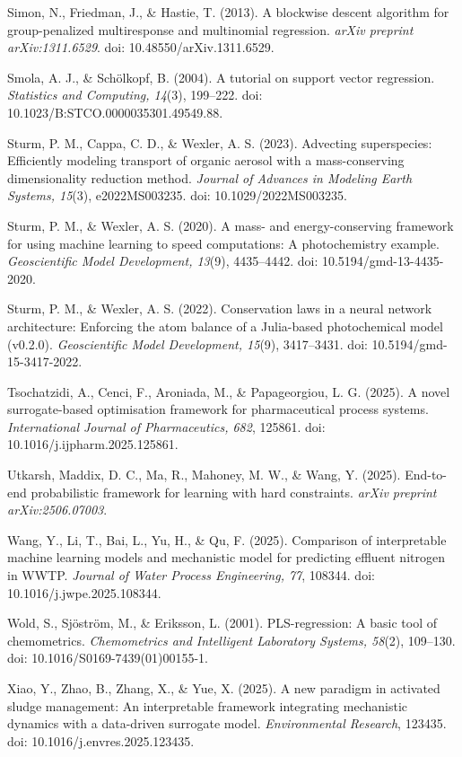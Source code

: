\documentclass[a4paper,fleqn]{cas-sc}
\begin{document}
\noindent Simon, N., Friedman, J., \& Hastie, T. (2013). A blockwise descent algorithm for group-penalized multiresponse and multinomial regression. \textit{arXiv preprint arXiv:1311.6529}. doi: 10.48550/arXiv.1311.6529.

\noindent Smola, A. J., \& Sch\"olkopf, B. (2004). A tutorial on support vector regression. \textit{Statistics and Computing, 14}(3), 199--222. doi: 10.1023/B:STCO.0000035301.49549.88.

\noindent Sturm, P. M., Cappa, C. D., \& Wexler, A. S. (2023). Advecting superspecies: Efficiently modeling transport of organic aerosol with a mass-conserving dimensionality reduction method. \textit{Journal of Advances in Modeling Earth Systems, 15}(3), e2022MS003235. doi: 10.1029/2022MS003235.

\noindent Sturm, P. M., \& Wexler, A. S. (2020). A mass- and energy-conserving framework for using machine learning to speed computations: A photochemistry example. \textit{Geoscientific Model Development, 13}(9), 4435--4442. doi: 10.5194/gmd-13-4435-2020.

\noindent Sturm, P. M., \& Wexler, A. S. (2022). Conservation laws in a neural network architecture: Enforcing the atom balance of a Julia-based photochemical model (v0.2.0). \textit{Geoscientific Model Development, 15}(9), 3417--3431. doi: 10.5194/gmd-15-3417-2022.

\noindent Tsochatzidi, A., Cenci, F., Aroniada, M., \& Papageorgiou, L. G. (2025). A novel surrogate-based optimisation framework for pharmaceutical process systems. \textit{International Journal of Pharmaceutics, 682}, 125861. doi: 10.1016/j.ijpharm.2025.125861.

\noindent Utkarsh, Maddix, D. C., Ma, R., Mahoney, M. W., \& Wang, Y. (2025). End-to-end probabilistic framework for learning with hard constraints. \textit{arXiv preprint arXiv:2506.07003}.

\noindent Wang, Y., Li, T., Bai, L., Yu, H., \& Qu, F. (2025). Comparison of interpretable machine learning models and mechanistic model for predicting effluent nitrogen in WWTP. \textit{Journal of Water Process Engineering, 77}, 108344. doi: 10.1016/j.jwpe.2025.108344.

\noindent Wold, S., Sj\"ostr\"om, M., \& Eriksson, L. (2001). PLS-regression: A basic tool of chemometrics. \textit{Chemometrics and Intelligent Laboratory Systems, 58}(2), 109--130. doi: 10.1016/S0169-7439(01)00155-1.

\noindent Xiao, Y., Zhao, B., Zhang, X., \& Yue, X. (2025). A new paradigm in activated sludge management: An interpretable framework integrating mechanistic dynamics with a data-driven surrogate model. \textit{Environmental Research}, 123435. doi: 10.1016/j.envres.2025.123435.
\end{document}
